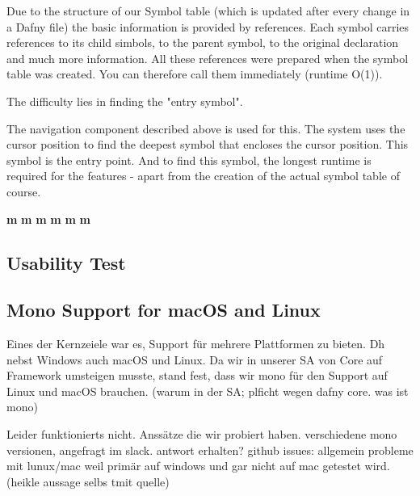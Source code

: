 Due to the structure of our Symbol table (which is updated after every change in a Dafny file)
the basic information is provided by references.
Each symbol carries references to its child simbols, to the parent symbol, to the original declaration and much more information.
All these references were prepared when the symbol table was created. You can therefore call them immediately (runtime O(1)).

The difficulty lies in finding the "entry symbol".

The navigation component described above is used for this. The system uses the cursor position to find the deepest symbol that encloses the cursor position. This symbol is the entry point. And to find this symbol, the longest runtime is required for the features - apart from the creation of the actual symbol table of course.

\textbf{m}
\textbf{m}
\textbf{m}
\textbf{m}
\textbf{m}
\textbf{m}

\subsection{Usability Test}


\subsection{Mono Support for macOS and Linux}
Eines der Kernzeiele war es, Support für mehrere Plattformen zu bieten. Dh nebst Windows auch macOS und Linux.
Da wir in unserer SA von Core auf Framework umsteigen musste, stand fest, dass wir mono für den Support auf Linux und macOS brauchen.
(warum in der SA; plficht wegen dafny core. was ist mono)

Leider funktionierts nicht.
Anssätze die wir probiert haben. verschiedene mono versionen, angefragt im slack. antwort erhalten?
github issues: allgemein probleme mit lunux/mac weil primär auf windows und gar nicht auf mac getestet wird. (heikle aussage selbs tmit quelle)

\cite{sa}
\cite{mono-slack}
\cite{mono-git}
